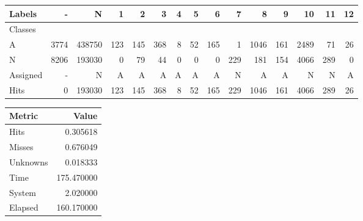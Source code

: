 \begin{tabular}{l|r|r|r|r|r|r|r|r|r|r|r|r|r|r}

Labels &     - &       N &    1 &    2 &    3 &  4 &   5 &    6 &    7 &     8 &    9 &    10 &   11 &  12 \\\hline
Classes  &       &         &      &      &      &    &     &      &      &       &      &       &      &     \\\hline
\hline
A        &  3774 &  438750 &  123 &  145 &  368 &  8 &  52 &  165 &    1 &  1046 &  161 &  2489 &   71 &  26 \\\hline
N        &  8206 &  193030 &    0 &   79 &   44 &  0 &   0 &    0 &  229 &   181 &  154 &  4066 &  289 &   0 \\\hline
\hline
Assigned &     - &       N &    A &    A &    A &  A &   A &    A &    N &     A &    A &     N &    N &   A \\\hline
Hits     &     0 &  193030 &  123 &  145 &  368 &  8 &  52 &  165 &  229 &  1046 &  161 &  4066 &  289 &  26 
\end{tabular}
\begin{tabular}{l|r}

Metric   &       Value \\\hline
\hline
Hits     &    0.305618 \\\hline
Misses   &    0.676049 \\\hline
Unknowns &    0.018333 \\\hline
Time     &  175.470000 \\\hline
System   &    2.020000 \\\hline
Elapsed  &  160.170000 
\end{tabular}
